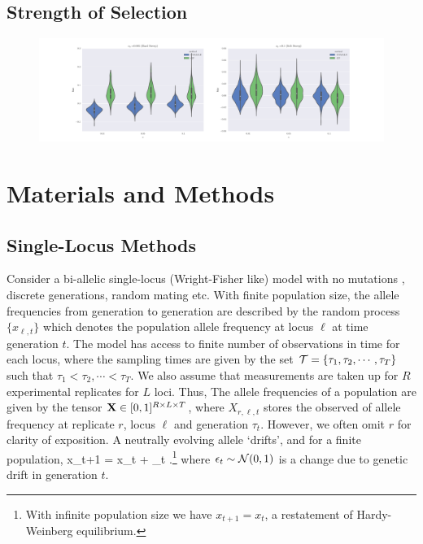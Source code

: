\documentclass[11pt]{article}
\begin{document}
\subsection{Strength of  Selection}
\begin{figure}
	\centering
	\includegraphics[trim=2.2in 0 2.2in 0, 
	clip,width=\textwidth]{bias}
\end{figure}

\section{Materials and Methods}

\subsection{Single-Locus Methods}
Consider a bi-allelic single-locus (Wright-Fisher like) model with no
mutations \cite{Ewens2012Mathematical}, discrete generations, random
mating etc. With finite population size, the allele frequencies from
generation to generation are described by the random process
$\{x_{\ell,t}\}$ which denotes the population allele frequency at
locus $\ell$ at time generation $t$. The model has access to finite
number of observations in time for each locus, where the sampling
times are given by the set ${\cal T}=\{\tau_1,\tau_2,\cdots, \tau_T \}$
such that $\tau_1<\tau_2,\cdots<\tau_T$. We also assume that
measurements are taken up for $R$ experimental replicates for $L$
loci. Thus, The allele frequencies of a population are given by the
tensor ${\mathbf X} \in [0,1]^{R \times L \times T}$, where $X_{r,\ell,t}$
stores the observed of allele frequency at replicate $r$, locus $\ell$
and generation $\tau_t$. However, we often omit $r$ for clarity of
exposition. A neutrally evolving allele `drifts', and for a finite
population,
\beq x_{t+1} = x_t + \epsilon_t\; .\footnote{With infinite population size
	we have $x_{t+1} = x_t$, a restatement of Hardy-Weinberg
	equilibrium.}
\label{eq:drift}
\eeq where $\epsilon_t \sim {\cal N}(0,1)$ is a change due to genetic drift
in generation $t$.
\end{document}
